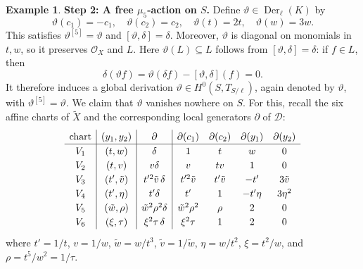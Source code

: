 \documentclass[10pt,abstract=true]{scrartcl}
\numberwithin{equation}{section}
\theoremstyle{definition}
\newtheorem{example}[theorem]{Example}
\theoremstyle{remark}
\begin{document}
\begin{example}
  \par\smallskip
  \noindent\textbf{Step 2: A free $\mu_5$-action on $S$.}
  Define \(\vartheta\in\operatorname{Der}_{\ell}(K)\) by
  \[
    \vartheta(c_1)=-c_1,\quad \vartheta(c_2)=c_2,\quad
    \vartheta(t)=2t,\quad \vartheta(w)=3w.
  \]
  This satisfies \(\vartheta^{[5]}=\vartheta\) and \([\vartheta,\delta]=\delta\).
  Moreover, \(\vartheta\) is diagonal on monomials in \(t,w\), so it preserves \(\mathcal O_X\) and \(L\).
  Here \(\vartheta(L)\subseteq L\) follows from \([\vartheta,\delta]=\delta\): if \(f\in L\), then
  \[
    \delta(\vartheta f)=\vartheta(\delta f)-[\vartheta,\delta](f)=0.
  \]
  It therefore induces a global derivation \(\vartheta\in H^0(S,T_{S/\ell})\), again denoted by \(\vartheta\), with \(\vartheta^{[5]}=\vartheta\).
  We claim that \(\vartheta\) vanishes nowhere on \(S\).
  For this, recall the six affine charts of \(\widetilde X\) and the corresponding local generators \(\partial\) of \(\mathcal D\):
  \[
    {
    \renewcommand{\arraystretch}{1.2}
    \begin{array}{c|c|c|cccc}
      \text{chart} & (y_1,y_2) & \partial & \partial(c_1) & \partial(c_2) & \partial(y_1) & \partial(y_2) \\
      \hline
      V_1 & (t,w) & \delta & 1 & t & w & 0\\
      V_2 & (t,v) & v\delta & v & tv & 1 & 0\\
      V_3 & (t',\tilde v) & t'^2\tilde v\,\delta & t'^2\tilde v & t'\tilde v & -t' & 3\tilde v\\
      V_4 & (t',\eta) & t'\delta & t' & 1 & -t'\eta & 3\eta^2\\
      V_5 & (\tilde w,\rho) & \tilde w^2\rho^2\delta & \tilde w^2\rho^2 & \rho & 2 & 0\\
      V_6 & (\xi,\tau) & \xi^2\tau\,\delta & \xi^2\tau & 1 & 2 & 0
    \end{array}
    }
  \]
  where \(t'=1/t\), \(v=1/w\), \(\tilde w=w/t^3\), \(\tilde v=1/\tilde w\), \(\eta=w/t^2\), \(\xi=t^2/w\), and \(\rho=t^5/w^2=1/\tau\).


\end{example}
\end{document}
